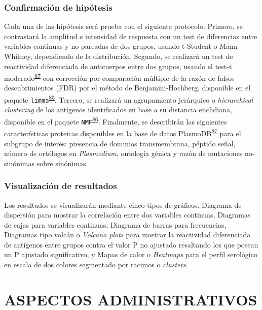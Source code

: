 \documentclass[]{article}
\begin{document}
\subsubsection{Confirmación de
hipótesis}\label{confirmacion-de-hipotesis}

Cada una de las hipótesis será prueba con el siguiente protocolo.
Primero, se contrastará la amplitud e intensidad de respuesta con un
test de diferencias entre variables continuas y no pareadas de dos
grupos, usando t-Student o Mann-Whitney, dependiendo de la distribución.
Segundo, se realizará un test de reactividad diferenciada de anticuerpos
entre dos grupos, usando el test-t
moderado\textsuperscript{\protect\hyperlink{ref-smyth2004ebayes}{67}}
con corrección por comparación múltiple de la razón de falsos
descubrimientos (FDR) por el método de Benjamini-Hochberg, disponible en
el paquete
\texttt{limma}\textsuperscript{\protect\hyperlink{ref-limma}{85}}.
Tercero, se realizará un agrupamiento jerárquico o \emph{hierarchical
clustering} de los antígenos identificados en base a su distancia
euclidiana, disponible en el paquete
\texttt{NMF}\textsuperscript{\protect\hyperlink{ref-Gaujoux2010NMF}{86}}.
Finalmente, se describirán las siguientes características proteicas
disponibles en la base de datos
PlasmoDB\textsuperscript{\protect\hyperlink{ref-plasmodb}{87}} para el
subgrupo de interés: presencia de dominios transmembrana, péptido señal,
número de ortólogos en \emph{Plasmodium}, ontología génica y razón de
mutaciones no-sinónimas sobre sinónimas.

\subsubsection{Visualización de
resultados}\label{visualizacion-de-resultados}

Los resultados se visualizarán mediante cinco tipos de gráficos.
Diagrama de dispersión para mostrar la correlación entre dos variables
continuas, Diagramas de cajas para variables continuas, Diagrama de
barras para frecuencias, Diagramas tipo volcán o \emph{Volcano plots}
para mostrar la reactividad diferenciada de antígenos entre grupos
contra el valor P no ajustado resaltando los que posean un P ajustado
significativo, y Mapas de calor o \emph{Heatmaps} para el perfil
serológico en escala de dos colores segmentado por racimos o
\emph{clusters}.

\section{ASPECTOS ADMINISTRATIVOS}\label{aspectos-administrativos}
\end{document}
